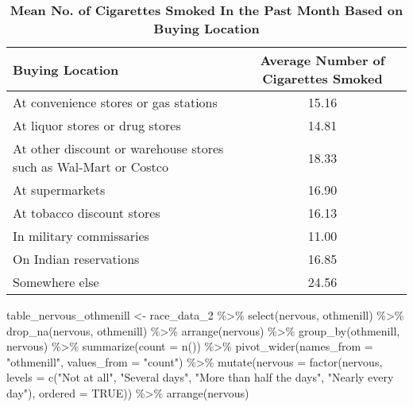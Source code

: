 \documentclass[
]{article}
\newenvironment{Shaded}{\begin{snugshade}}{\end{snugshade}}
\newcommand{\AttributeTok}[1]{\textcolor[rgb]{0.77,0.63,0.00}{#1}}
\newcommand{\ConstantTok}[1]{\textcolor[rgb]{0.00,0.00,0.00}{#1}}
\newcommand{\FunctionTok}[1]{\textcolor[rgb]{0.00,0.00,0.00}{#1}}
\newcommand{\NormalTok}[1]{#1}
\newcommand{\OtherTok}[1]{\textcolor[rgb]{0.56,0.35,0.01}{#1}}
\newcommand{\SpecialCharTok}[1]{\textcolor[rgb]{0.00,0.00,0.00}{#1}}
\newcommand{\StringTok}[1]{\textcolor[rgb]{0.31,0.60,0.02}{#1}}
\begin{document}
\begin{table}[H]

\caption{\label{tab:importing data for reference}\textbf{Mean No. of Cigarettes Smoked In
      the Past Month Based on Buying Location}}
\centering
\begin{tabular}[t]{lc}
\toprule
Buying Location & Average Number of Cigarettes Smoked\\
\midrule
At convenience stores or gas stations & 15.16\\
At liquor stores or drug stores & 14.81\\
At other discount or warehouse stores such as Wal-Mart or Costco & 18.33\\
At supermarkets & 16.90\\
At tobacco discount stores & 16.13\\
\addlinespace
In military commissaries & 11.00\\
On Indian reservations & 16.85\\
Somewhere else & 24.56\\
\bottomrule
\end{tabular}
\end{table}

\begin{Shaded}
\begin{Highlighting}[]
\NormalTok{table\_nervous\_othmenill }\OtherTok{\textless{}{-}}\NormalTok{ race\_data\_2 }\SpecialCharTok{\%\textgreater{}\%}
  \FunctionTok{select}\NormalTok{(nervous, othmenill) }\SpecialCharTok{\%\textgreater{}\%}
  \FunctionTok{drop\_na}\NormalTok{(nervous, othmenill) }\SpecialCharTok{\%\textgreater{}\%}
  \FunctionTok{arrange}\NormalTok{(nervous) }\SpecialCharTok{\%\textgreater{}\%}
  \FunctionTok{group\_by}\NormalTok{(othmenill, nervous) }\SpecialCharTok{\%\textgreater{}\%}
  \FunctionTok{summarize}\NormalTok{(}\AttributeTok{count =} \FunctionTok{n}\NormalTok{()) }\SpecialCharTok{\%\textgreater{}\%}
  \FunctionTok{pivot\_wider}\NormalTok{(}\AttributeTok{names\_from =} \StringTok{"othmenill"}\NormalTok{, }\AttributeTok{values\_from =} \StringTok{"count"}\NormalTok{) }\SpecialCharTok{\%\textgreater{}\%}
  \FunctionTok{mutate}\NormalTok{(}\AttributeTok{nervous =} \FunctionTok{factor}\NormalTok{(nervous,}
                          \AttributeTok{levels =} \FunctionTok{c}\NormalTok{(}\StringTok{"Not at all"}\NormalTok{, }\StringTok{"Several days"}\NormalTok{,}
                                                    \StringTok{"More than half the days"}\NormalTok{,}
                                                    \StringTok{"Nearly every day"}\NormalTok{),}
                          \AttributeTok{ordered =} \ConstantTok{TRUE}\NormalTok{)) }\SpecialCharTok{\%\textgreater{}\%}
  \FunctionTok{arrange}\NormalTok{(nervous)}
\end{Highlighting}
\end{Shaded}
\end{document}
